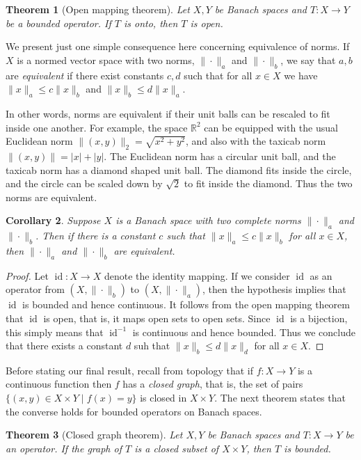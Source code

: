 \documentclass[11pt,oneside]{amsbook}
\newcommand{\RR}{{\mathbb R}}
\DeclareMathOperator{\id}{id}
\theoremstyle{definition}
\theoremstyle{plain}
\newtheorem{thm}{Theorem}[section]
\newtheorem{cor}[thm]{Corollary}
\theoremstyle{definition}
\theoremstyle{remark}
\numberwithin{equation}{section}
\numberwithin{figure}{section}
\begin{document}
\begin{thm}[Open mapping theorem]
  Let $X,Y$ be Banach spaces and $T\colon X\to Y$ be a bounded operator. If $T$ is onto, then $T$ is open.
\end{thm}

We present just one simple consequence here concerning equivalence of norms. If $X$ is a normed vector space with two norms, $\|\cdot\|_a$ and $\|\cdot\|_b$, we say that $a,b$ are \emph{equivalent} if there exist constants $c,d$ such that for all $x\in X$ we have $\|x\|_a\leq c\|x\|_b$ and $\|x\|_b\leq d\|x\|_a$.

In other words, norms are equivalent if their unit balls can be rescaled to fit inside one another. For example, the space $\RR^2$ can be equipped with the usual Euclidean norm $\|(x,y)\|_2=\sqrt{x^2+y^2}$, and also with the taxicab norm $\|(x,y)\|=|x|+|y|$. The Euclidean norm has a circular unit ball, and the taxicab norm has a diamond shaped unit ball. The diamond fits inside the circle, and the circle can be scaled down by $\sqrt2$ to fit inside the diamond. Thus the two norms are equivalent.

\begin{cor}
  Suppose $X$ is a Banach space with two complete norms $\|\cdot\|_a$ and $\|\cdot\|_b$. Then if there is a constant $c$ such that $\|x\|_a\leq c\|x\|_b$ for all $x\in X$, then $\|\cdot\|_a$ and $\|\cdot\|_b$ are equivalent.
\end{cor}

\begin{proof}
  Let $\id\colon X\to X$ denote the identity mapping. If we consider $\id$ as an operator from $(X,\|\cdot\|_b)$ to $(X,\|\cdot\|_a)$, then the hypothesis implies that $\id$ is bounded and hence continuous. It follows from the open mapping theorem that $\id$ is open, that is, it maps open sets to open sets. Since $\id$ is a bijection, this simply means that $\id^{-1}$ is continuous and hence bounded. Thus we conclude that there exists a constant $d$ suh that $\|x\|_b\leq d\|x\|_d$ for all $x\in X$.
\end{proof}

Before stating our final result, recall from topology that if $f\colon X\to Y$ is a continuous function then $f$ has a \emph{closed graph}, that is, the set of pairs $\{(x,y)\in X\times Y\mid f(x)=y\}$ is closed in $X\times Y$. The next theorem states that the converse holds for bounded operators on Banach spaces.

\begin{thm}[Closed graph theorem]
  Let $X,Y$ be Banach spaces and $T\colon X\to Y$ be an operator. If the graph of $T$ is a closed subset of $X\times Y$, then $T$ is bounded.
\end{thm}
\end{document}
